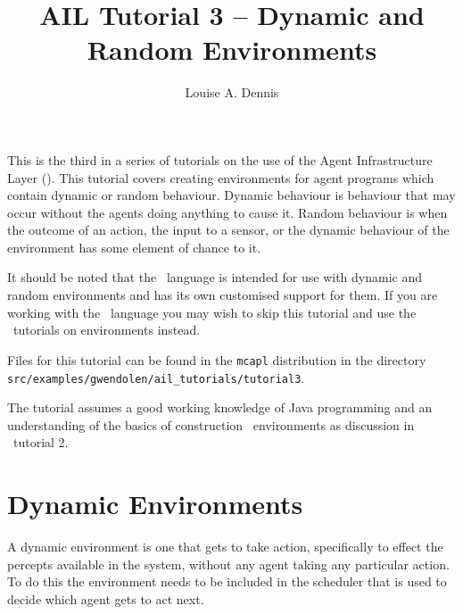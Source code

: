 \documentclass[a4]{article}
\author{Louise A. Dennis}
\title{AIL Tutorial 3 -- Dynamic and Random Environments}
\begin{document}
\maketitle
This is the third in a series of tutorials on the use of the Agent Infrastructure Layer (\ail).  This tutorial covers creating environments for agent programs which contain dynamic or random behaviour.   Dynamic behaviour is behaviour that may occur without the agents doing anything to cause it.  Random behaviour is when the outcome of an action, the input to a sensor, or the dynamic behaviour of the environment has some element of chance to it.

It should be noted that the \eass\ language is intended for use with dynamic and random environments and has its own customised support for them.  If you are working with the \eass\ language you may wish to skip this tutorial and use the \eass\ tutorials on environments instead.

Files for this tutorial can be found in the \texttt{mcapl} distribution in the directory \texttt{src/examples/gwendolen/ail\_tutorials/tutorial3}.

The tutorial assumes a good working knowledge of Java programming and an understanding of the basics of construction \ail\ environments as discussion in \ail\ tutorial 2.

\section{Dynamic Environments}

A dynamic environment is one that gets to take action, specifically to effect the percepts available in the system, without any agent taking any particular action.  To do this the environment needs to be included in the scheduler that is used to decide which agent gets to act next.
\end{document}
